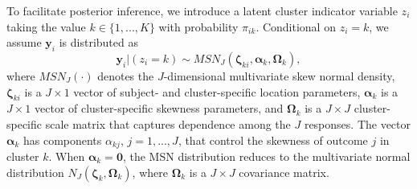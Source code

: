 \documentclass[useAMS,referee]{biom}
\begin{document}
To facilitate posterior inference, we introduce a latent cluster indicator variable $z_i$ taking the value $k \in \{1,...,K\}$ with probability $\pi_{ik}$. Conditional on $z_i = k$, we assume $\mathbf{y}_{i}$ is distributed as
\begin{equation}
\mathbf{y}_{i}|(z_i=k) \sim MSN_J(\boldsymbol\zeta_{ki},\boldsymbol\alpha_k,\boldsymbol\Omega_k), \label{eq:msndens}
\end{equation}
where $MSN_J(\cdot)$ denotes the $J$-dimensional multivariate skew normal density, $\boldsymbol\zeta_{ki}$ is a $J \times 1$ vector of subject- and cluster-specific location parameters, $\boldsymbol\alpha_k$ is a $J \times 1$ vector of cluster-specific skewness parameters, and $\boldsymbol\Omega_k$ is a $J \times J$ cluster-specific scale matrix that captures dependence among the $J$ responses. The vector $\boldsymbol\alpha_k$ has components $\alpha_{kj}$, $j = 1,...,J$, that control the skewness of outcome $j$ in cluster $k$. When $\boldsymbol\alpha_k = \mathbf{0}$, the MSN distribution reduces to the multivariate normal distribution $N_J(\boldsymbol\zeta_k,\boldsymbol\Omega_k)$, where $\boldsymbol\Omega_k$ is a $J \times J$ covariance matrix.
\end{document}

